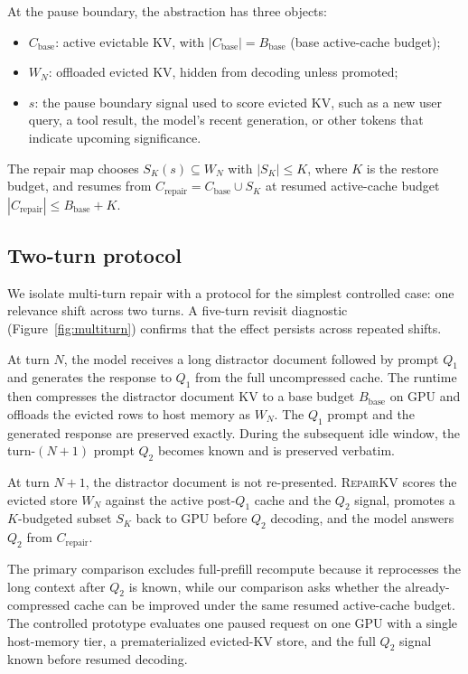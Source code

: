 \documentclass{article}
\newcommand{\repairkv}{\textsc{RepairKV}}
\newcommand{\bbase}{\ensuremath{B_{\mathrm{base}}}}
\begin{document}
At the pause boundary, the abstraction has three objects:
\begin{itemize}[leftmargin=1.4em,noitemsep,topsep=2pt]
  \item $C_{\mathrm{base}}$: active evictable KV, with
  $|C_{\mathrm{base}}|=\bbase$ (base active-cache budget);
  \item $W_N$: offloaded evicted KV, hidden from decoding unless promoted; 
  \item $s$: {the pause boundary signal used to score evicted KV,} such as a new user
  query, a tool result, the model's recent generation, or other tokens
  that {indicate upcoming significance.}
\end{itemize}
{The repair map chooses $S_K(s)\subseteq W_N$ with
$|S_K|\le K$, where $K$ is the restore budget}, and resumes from
$C_{\mathrm{repair}}=C_{\mathrm{base}}\cup S_K$ at resumed
active-cache budget $|C_{\mathrm{repair}}|\le \bbase+K$. 

\subsection{Two-turn protocol}
{We isolate multi-turn repair with a protocol for the simplest controlled case: one relevance shift across two turns. A five-turn revisit diagnostic (Figure~\ref{fig:multiturn}) confirms that the effect persists across repeated shifts.}

At turn $N$, the model receives a long distractor document followed by prompt $Q_1$ and generates the response to $Q_1$ from the full uncompressed cache. The runtime then compresses the distractor document KV to a base budget $\bbase$ on GPU and offloads the evicted rows to host memory as $W_N$. The $Q_1$ prompt and the generated response are preserved exactly. During the subsequent idle window, the turn-$(N{+}1)$ prompt $Q_2$ becomes known and is preserved verbatim.

At turn $N{+}1$, the distractor document is not re-presented. \repairkv{} scores the evicted store $W_N$ against the active post-$Q_1$ cache and the $Q_2$ signal, promotes a $K$-budgeted subset $S_K$ back to GPU before $Q_2$ decoding, and the model answers $Q_2$ from $C_{\mathrm{repair}}$.

The primary comparison excludes full-prefill recompute because it reprocesses the long context after $Q_2$ is known, while our comparison asks whether the already-compressed cache can be improved under the same resumed active-cache budget. The controlled prototype evaluates one paused request on one GPU with a single host-memory tier, a prematerialized evicted-KV store, and the full $Q_2$ signal known before resumed decoding.
\end{document}
